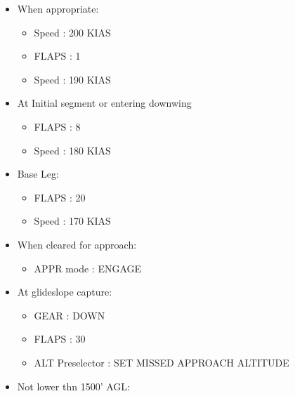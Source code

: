 \begin{itemize}
\item When appropriate:

\begin{itemize}
\item Speed : 200 KIAS

\item FLAPS : 1

\item Speed : 190 KIAS

\end{itemize}

\item At Initial segment or entering downwing

\begin{itemize}
\item FLAPS : 8

\item Speed : 180 KIAS

\end{itemize}

\item Base Leg:

\begin{itemize}
\item FLAPS : 20

\item Speed : 170 KIAS

\end{itemize}

\item When cleared for approach:

\begin{itemize}
\item APPR mode : ENGAGE

\end{itemize}

\item At glideslope capture:

\begin{itemize}
\item GEAR : DOWN

\item FLAPS : 30

\item ALT Preselector : SET MISSED APPROACH ALTITUDE

\end{itemize}

\item Not lower thn 1500' AGL:


\end{itemize}
